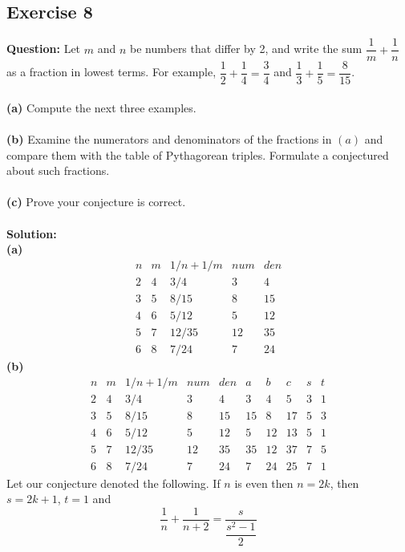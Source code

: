 \documentclass{article}
\begin{document}
\subsection{Exercise 8}
\textbf{Question:} Let $m$ and $n$ be numbers that differ by 2, and write the sum $\dfrac{1}{m}+\dfrac{1}{n}$ as a fraction in lowest terms. For example, $\dfrac{1}{2}+\dfrac{1}{4} = \dfrac{3}{4}$ and $\dfrac{1}{3}+\dfrac{1}{5}=\dfrac{8}{15}$.\\
\\\textbf{(a)} Compute the next three examples.\\
\\\textbf{(b)} Examine the numerators and denominators of the fractions in $(a)$ and compare them with the table of Pythagorean triples. Formulate a conjectured about such fractions.\\
\\\textbf{(c)} Prove your conjecture is correct.\\
\\\textbf{Solution:}\\
\textbf{(a)}
\begin{displaymath}
\begin{array}{c|c|c|c|c}
n & m & 1/n + 1/m & num & den\\
\hline
2 & 4 & 3/4 & 3 & 4\\
3 & 5 & 8/15 & 8 & 15\\
4 & 6 & 5/12 & 5 & 12\\
5 & 7 & 12/35 & 12 & 35\\
6 & 8 & 7/24 & 7 & 24
\end{array}
\end{displaymath}
\textbf{(b)}
\begin{displaymath}
\begin{array}{c|c|c|c|c|c|c|c|c|c}
n & m & 1/n + 1/m & num & den & a & b & c & s & t\\
\hline
2 & 4 & 3/4 & 3 & 4 & 3 & 4 & 5 & 3 & 1\\
3 & 5 & 8/15 & 8 & 15 & 15 & 8 & 17 & 5 & 3\\
4 & 6 & 5/12 & 5 & 12 & 5 & 12 & 13 & 5 & 1\\
5 & 7 & 12/35 & 12 & 35 & 35 & 12 & 37 & 7 & 5\\
6 & 8 & 7/24 & 7 & 24 & 7 & 24 & 25 & 7 & 1
\end{array}
\end{displaymath}
Let our conjecture denoted the following. If $n$ is even then $n = 2k$, then $s = 2k+1$, $t = 1$ and
\begin{equation*}
\dfrac{1}{n}+\dfrac{1}{n+2}=\dfrac{s}{\dfrac{s^2-1}{2}}
\end{equation*}
\end{document}
